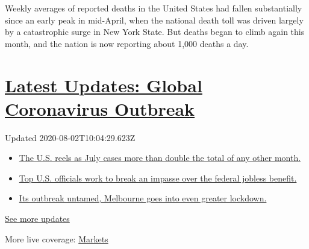 Weekly averages of reported deaths in the United States had fallen
substantially since an early peak in mid-April, when the national death
toll was driven largely by a catastrophic surge in New York State. But
deaths began to climb again this month, and the nation is now reporting
about 1,000 deaths a day.

\hypertarget{latest-updates-global-coronavirus-outbreak}{%
\section{\texorpdfstring{\href{https://www.nytimes.com/2020/08/01/world/coronavirus-covid-19.html?action=click\&pgtype=Article\&state=default\&region=MAIN_CONTENT_1\&context=storylines_live_updates}{Latest
Updates: Global Coronavirus
Outbreak}}{Latest Updates: Global Coronavirus Outbreak}}\label{latest-updates-global-coronavirus-outbreak}}

Updated 2020-08-02T10:04:29.623Z

\begin{itemize}
\tightlist
\item
  \href{https://www.nytimes.com/2020/08/01/world/coronavirus-covid-19.html?action=click\&pgtype=Article\&state=default\&region=MAIN_CONTENT_1\&context=storylines_live_updates\#link-34047410}{The
  U.S. reels as July cases more than double the total of any other
  month.}
\item
  \href{https://www.nytimes.com/2020/08/01/world/coronavirus-covid-19.html?action=click\&pgtype=Article\&state=default\&region=MAIN_CONTENT_1\&context=storylines_live_updates\#link-780ec966}{Top
  U.S. officials work to break an impasse over the federal jobless
  benefit.}
\item
  \href{https://www.nytimes.com/2020/08/01/world/coronavirus-covid-19.html?action=click\&pgtype=Article\&state=default\&region=MAIN_CONTENT_1\&context=storylines_live_updates\#link-2bc8948}{Its
  outbreak untamed, Melbourne goes into even greater lockdown.}
\end{itemize}

\href{https://www.nytimes.com/2020/08/01/world/coronavirus-covid-19.html?action=click\&pgtype=Article\&state=default\&region=MAIN_CONTENT_1\&context=storylines_live_updates}{See
more updates}

More live coverage:
\href{https://www.nytimes.com/live/2020/07/31/business/stock-market-today-coronavirus?action=click\&pgtype=Article\&state=default\&region=MAIN_CONTENT_1\&context=storylines_live_updates}{Markets}

